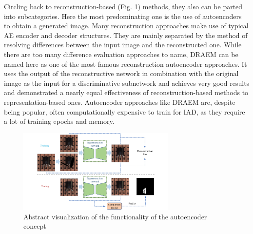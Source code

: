 Circling back to reconstruction-based (Fig. \ref{fig:autoencoderviz}) methods, they also can be parted into subcategories. Here the most predominating one is the use of autoencoders to obtain a generated image. Many 
reconstruction approaches make use of typical AE encoder and decoder structures. They are mainly separated by the method of resolving differences between the input image and the reconstructed one. 
While there are too many difference evaluation approaches to name, DRAEM \cite{Zavrtanik_2021DRAEM} can be named here as one of the most famous reconstruction autoencoder approaches. It uses 
the output of the reconstructive network in combination with the original image as the input for a discriminative subnetwork and achieves very good results and demonstrated a nearly equal effectiveness 
of reconstruction-based methods to representation-based ones. Autoencoder approaches like DRAEM are, despite being popular, often computationally expensive to train for IAD, as they require a lot of 
training epochs and memory. %

\begin{figure}[H]
    \centering
    \includegraphics[width=0.7\textwidth]{figures/approachvizgeneral/autoencoderbiz.jpg}
    \caption{Abstract visualization of the functionality of the autoencoder concept \cite{liu2024deep}}
    \label{fig:autoencoderviz}
\end{figure}



